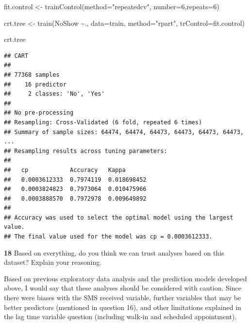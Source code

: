 \documentclass[
]{article}
\newenvironment{Shaded}{\begin{snugshade}}{\end{snugshade}}
\newcommand{\AttributeTok}[1]{\textcolor[rgb]{0.77,0.63,0.00}{#1}}
\newcommand{\DecValTok}[1]{\textcolor[rgb]{0.00,0.00,0.81}{#1}}
\newcommand{\FunctionTok}[1]{\textcolor[rgb]{0.00,0.00,0.00}{#1}}
\newcommand{\NormalTok}[1]{#1}
\newcommand{\OtherTok}[1]{\textcolor[rgb]{0.56,0.35,0.01}{#1}}
\newcommand{\SpecialCharTok}[1]{\textcolor[rgb]{0.00,0.00,0.00}{#1}}
\newcommand{\StringTok}[1]{\textcolor[rgb]{0.31,0.60,0.02}{#1}}
\begin{document}
\begin{Shaded}
\begin{Highlighting}[]
\NormalTok{fit.control }\OtherTok{\textless{}{-}} \FunctionTok{trainControl}\NormalTok{(}\AttributeTok{method=}\StringTok{"repeatedcv"}\NormalTok{, }\AttributeTok{number=}\DecValTok{6}\NormalTok{,}\AttributeTok{repeats=}\DecValTok{6}\NormalTok{)}
\end{Highlighting}
\end{Shaded}

\begin{Shaded}
\begin{Highlighting}[]
\NormalTok{crt.tree }\OtherTok{\textless{}{-}} \FunctionTok{train}\NormalTok{(NoShow }\SpecialCharTok{\textasciitilde{}}\NormalTok{., }\AttributeTok{data=}\NormalTok{train, }\AttributeTok{method=}\StringTok{"rpart"}\NormalTok{, }\AttributeTok{trControl=}\NormalTok{fit.control)}
\end{Highlighting}
\end{Shaded}

\begin{Shaded}
\begin{Highlighting}[]
\NormalTok{crt.tree}
\end{Highlighting}
\end{Shaded}

\begin{verbatim}
## CART 
## 
## 77368 samples
##    16 predictor
##     2 classes: 'No', 'Yes' 
## 
## No pre-processing
## Resampling: Cross-Validated (6 fold, repeated 6 times) 
## Summary of sample sizes: 64474, 64474, 64473, 64473, 64473, 64473, ... 
## Resampling results across tuning parameters:
## 
##   cp            Accuracy   Kappa      
##   0.0003612333  0.7974119  0.018698452
##   0.0003824823  0.7973064  0.010475966
##   0.0003888570  0.7972978  0.009649892
## 
## Accuracy was used to select the optimal model using the largest value.
## The final value used for the model was cp = 0.0003612333.
\end{verbatim}

\textbf{18} Based on everything, do you think we can trust analyses
based on this dataset? Explain your reasoning.

Based on previous exploratory data analysis and the prediction models
developed above, I would say that these analyses should be considered
with caution. Since there were biases with the SMS received variable,
further variables that may be better predictors (mentioned in question
16), and other limitations explained in the lag time variable question
(including walk-in and scheduled appointment).
\end{document}
